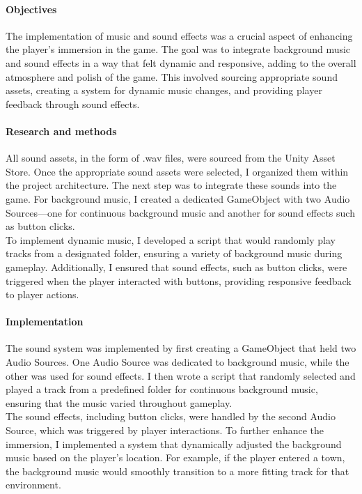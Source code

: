 \documentclass{article}
\begin{document}
\paragraph{Objectives}\hfill

The implementation of music and sound effects was a crucial aspect of enhancing the player's immersion in the game. The goal was to integrate background music and sound effects in a way that felt dynamic and responsive, adding to the overall atmosphere and polish of the game. This involved sourcing appropriate sound assets, creating a system for dynamic music changes, and providing player feedback through sound effects.

\paragraph{Research and methods}\hfill

All sound assets, in the form of .wav files, were sourced from the Unity Asset Store. Once the appropriate sound assets were selected, I organized them within the project architecture. The next step was to integrate these sounds into the game. For background music, I created a dedicated GameObject with two Audio Sources—one for continuous background music and another for sound effects such as button clicks.\\

To implement dynamic music, I developed a script that would randomly play tracks from a designated folder, ensuring a variety of background music during gameplay. Additionally, I ensured that sound effects, such as button clicks, were triggered when the player interacted with buttons, providing responsive feedback to player actions.

\paragraph{Implementation}\hfill

The sound system was implemented by first creating a GameObject that held two Audio Sources. One Audio Source was dedicated to background music, while the other was used for sound effects. I then wrote a script that randomly selected and played a track from a predefined folder for continuous background music, ensuring that the music varied throughout gameplay.\\

The sound effects, including button clicks, were handled by the second Audio Source, which was triggered by player interactions. To further enhance the immersion, I implemented a system that dynamically adjusted the background music based on the player's location. For example, if the player entered a town, the background music would smoothly transition to a more fitting track for that environment.
\end{document}
